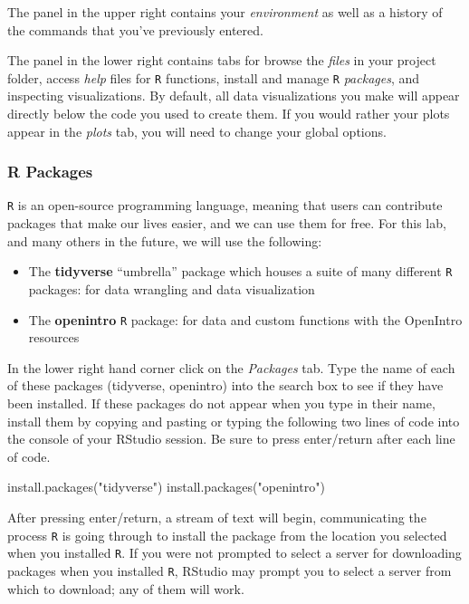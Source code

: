 \documentclass[
]{article}
\newenvironment{Shaded}{\begin{snugshade}}{\end{snugshade}}
\newcommand{\FunctionTok}[1]{\textcolor[rgb]{0.00,0.00,0.00}{#1}}
\newcommand{\NormalTok}[1]{#1}
\newcommand{\StringTok}[1]{\textcolor[rgb]{0.31,0.60,0.02}{#1}}
\providecommand{\tightlist}{%
  \setlength{\itemsep}{0pt}\setlength{\parskip}{0pt}}
\begin{document}
The panel in the upper right contains your \emph{environment} as well as a history of the commands that you've previously entered.

The panel in the lower right contains tabs for browse the \emph{files} in your project folder, access \emph{help} files for \texttt{R} functions, install and manage \texttt{R} \emph{packages}, and inspecting visualizations. By default, all data visualizations you make will appear directly below the code you used to create them. If you would rather your plots appear in the \emph{plots} tab, you will need to change your global options.

\hypertarget{r-packages}{%
\subsubsection{R Packages}\label{r-packages}}

\texttt{R} is an open-source programming language, meaning that users can contribute packages that make our lives easier, and we can use them for free. For this lab, and many others in the future, we will use the following:

\begin{itemize}
\tightlist
\item
  The \textbf{tidyverse} ``umbrella'' package which houses a suite of many different \texttt{R} packages: for data wrangling and data visualization
\item
  The \textbf{openintro} \texttt{R} package: for data and custom functions with the OpenIntro resources
\end{itemize}

In the lower right hand corner click on the \emph{Packages} tab. Type the name of each of these packages (tidyverse, openintro) into the search box to see if they have been installed. If these packages do not appear when you type in their name, install them by copying and pasting or typing the following two lines of code into the console of your RStudio session. Be sure to press enter/return after each line of code.

\begin{Shaded}
\begin{Highlighting}[]
\FunctionTok{install.packages}\NormalTok{(}\StringTok{"tidyverse"}\NormalTok{)}
\FunctionTok{install.packages}\NormalTok{(}\StringTok{"openintro"}\NormalTok{)}
\end{Highlighting}
\end{Shaded}

After pressing enter/return, a stream of text will begin, communicating the process \texttt{R} is going through to install the package from the location you selected when you installed \texttt{R}. If you were not prompted to select a server for downloading packages when you installed \texttt{R}, RStudio may prompt you to select a server from which to download; any of them will work.
\end{document}
